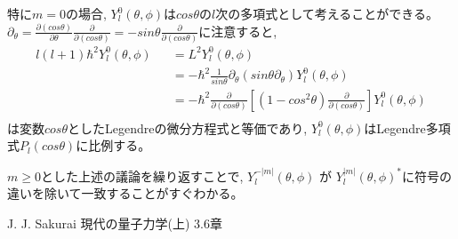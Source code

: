 \documentclass[11pt,a4paper]{jsarticle}
\begin{document}
特に$m=0$の場合, $Y_l^0 (\theta,\phi)$は$cos \theta$の$l$次の多項式として考えることができる。
$\partial_\theta= \frac{\partial( cos \theta)}{\partial \theta} \frac{\partial}{\partial( cos \theta)}= -sin\theta\frac{\partial}{\partial( cos \theta)}$に注意すると, 
\begin{eqnarray}
 l(l+1)\hbar^2 Y_l^0 (\theta,\phi)  &&= L^2 Y_l^0 (\theta,\phi) \nonumber \\
 &&= -\hbar^2 \frac{1}{sin\theta }\partial_\theta  ( sin\theta  \partial_\theta)Y_l^0 (\theta,\phi) \nonumber \\
 &&= - \hbar^2 \frac{\partial}{\partial( cos \theta)} [ ( 1- cos^2\theta) \frac{\partial}{\partial( cos \theta)} ] Y_l^0 (\theta,\phi) \nonumber \\
\end{eqnarray}
は変数$cos \theta$としたLegendreの微分方程式と等価であり, $Y_l^0 (\theta,\phi)$はLegendre多項式$P_l(cos\theta)$に比例する。

$m\ge0$とした上述の議論を繰り返すことで,  $Y_l^{-|m|} (\theta,\phi)$ が $Y_l^{|m|}(\theta,\phi)^*$に符号の違いを除いて一致することがすぐわかる。

\begin{thebibliography}{9}
 J. J. Sakurai 現代の量子力学(上) 3.6章
\end{thebibliography}
\end{document}
